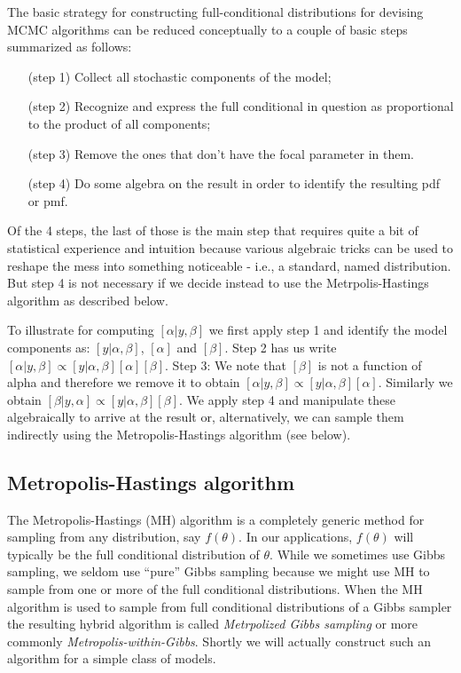 The basic strategy for constructing full-conditional distributions for
devising MCMC algorithms can be reduced conceptually to a couple of
basic steps summarized as follows:
\begin{itemize}
\item[(step 1)] Collect all stochastic components of the model; 
\item[(step 2)] Recognize and express the full conditional in question
  as proportional to the product of all components;
\item[(step 3)] Remove the ones that don't have the focal parameter in them. 
\item[(step 4)] Do some algebra on the result in order to identify the resulting pdf or pmf. 
\end{itemize}
Of the 4 steps, the last of those is the main step that requires quite
a bit of statistical experience and intuition because various
algebraic tricks can be used to reshape the mess into something
noticeable - i.e., a standard, named distribution. But step 4 is not
necessary if we decide instead to use the Metrpolis-Hastings algorithm
as described below.

To illustrate for computing $[\alpha|y,\beta]$ we first apply step 1
and identify the model components as: $[y|\alpha, \beta]$, $[\alpha]$
and $[\beta]$. Step 2 has us write $[\alpha|y,\beta] \propto
[y|\alpha,\beta][\alpha][\beta]$.  Step 3: We note that $[\beta]$ is not a
function of alpha and therefore we remove it to obtain $[\alpha|y,\beta]
\propto [y|\alpha,\beta][\alpha]$. Similarly we obtain $[\beta|y,\alpha]
\propto [y|\alpha,\beta][\beta]$. We apply step 4 and manipulate
these algebraically to arrive at the result or, alternatively, we can
sample them indirectly using the Metropolis-Hastings algorithm (see
below).


\subsection{Metropolis-Hastings algorithm}
 
The Metropolis-Hastings (MH) algorithm is a completely generic method for
sampling from any distribution, say $f(\theta)$. In our applications,
$f(\theta)$ will typically be the full conditional distribution of
$\theta$. 
While we sometimes use Gibbs sampling, we seldom
use ``pure'' Gibbs sampling because we might use MH to sample from one
or more of the full conditional distributions.
When the MH algorithm is used to sample from  full
conditional distributions of a Gibbs sampler the resulting hybrid algorithm is
called 
 {\it Metrpolized Gibbs sampling} or
more commonly {\it Metropolis-within-Gibbs}.
Shortly we will
actually construct such an algorithm for a simple class of models.

